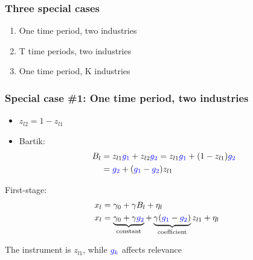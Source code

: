 \documentclass[notes,11pt, aspectratio=169]{beamer}
\begin{document}
\begin{frame}
\frametitle{Three  special cases}

\begin{enumerate}
  \setlength\itemsep{1em}
\item One time period, two industries
\item T time periods, two industries
\item One time period, K industries
\end{enumerate}

\end{frame}



\begin{frame}[label=twoindustries]
\frametitle{Special case \#1: One time period, two industries}
\begin{itemize}
	\setlength\itemsep{1em}
\item $z_{l2}= 1-z_{l1}$ 
\item Bartik:  \begin{align*}B_l &= z_{l1} \textcolor{blue}{g_1} + z_{l2} \textcolor{blue}{g_2}  =z_{l1} \textcolor{blue}{g_1} + (1-z_{l1}) \textcolor{blue}{g_2} \notag \\
&=\textcolor{blue}{g_2}+ (\textcolor{blue}{g_1} - \textcolor{blue}{g_2}) z_{l1} \notag
\end{align*}
\end{itemize} 
First-stage:
\begin{align*}
x_l &= \gamma_0 + \gamma B_l + \eta_l \notag \\
x_l &= \underbrace{\gamma_0+\gamma \textcolor{blue}{g_2}}_{\text{constant}} + \underbrace{\gamma (\textcolor{blue}{g_1} - \textcolor{blue}{g_2})}_{\text{coefficient}} z_{l1} + \eta_l \notag 
\end{align*}

The instrument is $z_{l1}$, while $\textcolor{blue}{g_k}$ affects relevance

\hyperlink{whyolsisbiased}{}




\end{frame}
\end{document}
